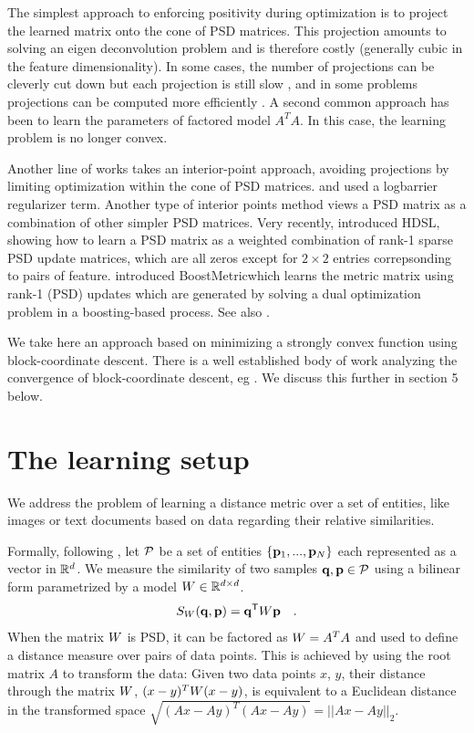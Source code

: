 \documentclass{article}
\begin{document}
The simplest approach to enforcing positivity during optimization is to project the learned matrix onto the cone of PSD matrices. This projection amounts to solving an eigen deconvolution problem and is therefore costly (generally cubic in the feature dimensionality). In some cases, the number of projections can be cleverly cut down but each projection is still slow \cite{qianHD, qian}, and in some problems projections can be computed more efficiently \cite{shalev2004online}. A second common approach has been to learn the parameters of factored model $A^TA$. In this case, the learning problem is no longer convex. 

Another line of works takes an interior-point approach, avoiding projections by limiting optimization within the cone of PSD matrices. \citet{davis2007information} and \citet{lego} used a logbarrier regularizer term. 
Another type of interior points method views a PSD matrix as a combination of other simpler PSD matrices. Very recently, \citet{hdsl} introduced HDSL, showing how to learn a PSD matrix as a weighted combination of rank-1 sparse PSD update matrices, which are all zeros except for $2\times2$ entries correpsonding to pairs of feature. \citet{boost} introduced BoostMetricwhich learns the metric matrix using rank-1 (PSD) updates which are generated by solving a dual optimization problem in a boosting-based process. See also \cite{bi2011adaboost}.

We take here an approach based on minimizing a strongly convex function using block-coordinate descent. There is a well established body of work analyzing the convergence of block-coordinate descent, eg \cite{nesterov2012efficiency,richtarik2014iteration}. We discuss this further in section 5 below.


\section{The learning setup}
We address the problem of learning a distance metric over a set of
entities, like images or text documents based on data regarding their
relative similarities.

Formally, following \cite{OASIS}, let $\cal{P}$ be a set of entities
$\{{\mathbf{p}}_1,...,{\mathbf{p}}_N\}$ each represented as a vector in $\mathbb{R}^d$.  We measure
the similarity of two samples ${\mathbf{q}}, {\mathbf{p}} \in \cal{P}$ using a bilinear
form parametrized by a model ${W} \in \mathbb{R}^{d \times d}$.
\begin{equation}
  S_{{W}}({\mathbf{q}}, {\mathbf{p}}) = {\mathbf{q}}{}^\mathsf{T} {W} {\mathbf{p}} \quad.
\end{equation}
When the matrix ${W}$ is PSD, it can be factored as ${W} = A^TA$ and used to define a distance measure over pairs of data points. This is achieved by using the root matrix $A$ to transform the data: Given two data points $x$, $y$, their distance through the matrix ${W}$, $(x-y)^T{W}(x-y)$, is equivalent to a Euclidean distance in the transformed space  $\sqrt{(Ax-Ay)^T(Ax-Ay)} = ||Ax-Ay||_2$. 
\end{document}
